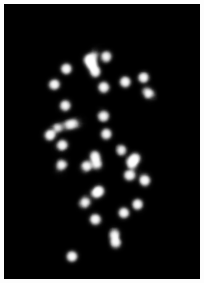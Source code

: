 \begin{figure}[htbp]
\begin{minipage}{.48\linewidth}
{            \includegraphics[width=\subwidth\linewidth]{fig/mask/mask-0.png}
        }
\end{minipage}
\end{figure}
